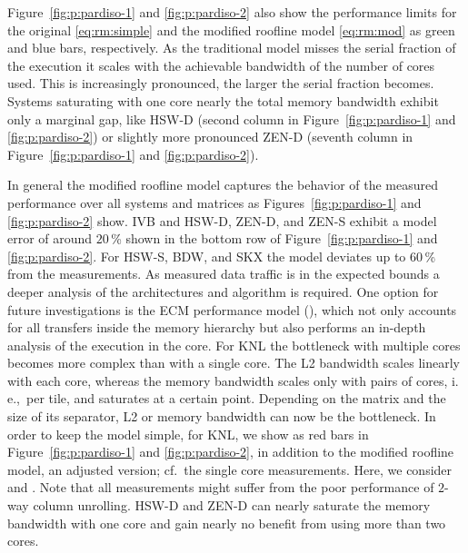 Figure~\ref{fig:p:pardiso-1} and \ref{fig:p:pardiso-2} also show the performance limits for the original
\eqref{eq:rm:simple} and the modified roofline model \eqref{eq:rm:mod}
as green and blue bars, respectively.
As the traditional model misses the serial fraction of the execution it scales
with the achievable bandwidth of the number of cores used.
This is increasingly pronounced, the larger the serial fraction becomes. 
%
Systems saturating with one core nearly the total memory bandwidth exhibit
only a marginal gap, like HSW-D (second column in Figure~\ref{fig:p:pardiso-1} and \ref{fig:p:pardiso-2}) or
slightly more pronounced ZEN-D (seventh column in Figure~\ref{fig:p:pardiso-1} and \ref{fig:p:pardiso-2}).

In general the modified roofline model captures the behavior of the measured
performance over all systems and matrices as Figures~\ref{fig:p:pardiso-1} and \ref{fig:p:pardiso-2} show.
%
%
IVB and HSW-D, ZEN-D, and ZEN-S exhibit a model error of around $20$\,\% shown
in the bottom row of Figure~\ref{fig:p:pardiso-1} and \ref{fig:p:pardiso-2}.
For HSW-S, BDW, and SKX the model deviates up to $60$\,\% from the measurements.
%
%
As measured data traffic is in the expected bounds a deeper analysis of the
architectures and algorithm is required.
One option for future investigations is the ECM performance
model (\cite{hager-2012-ecm}), which not only accounts for all transfers inside
the memory hierarchy but also performs an in-depth analysis of the execution in
the core.
%
%
For KNL the bottleneck with multiple cores becomes more complex than with a
single core.
The L2 bandwidth scales linearly with each core, whereas the memory bandwidth
scales only with pairs of cores, i.\,e.,\ per tile, and saturates at a certain
point.
Depending on the matrix and the size of its separator, L2 or memory bandwidth can
now be the bottleneck.
%
In order to keep the model simple, for KNL, we show
as red bars in Figure~\ref{fig:p:pardiso-1} and \ref{fig:p:pardiso-2},
in addition
to the modified
roofline model, 
an adjusted version; cf.\ the single core measurements.
Here, we consider  and .
Note that all measurements might suffer from the poor performance of $2$-way
column unrolling.
%
% 
HSW-D and ZEN-D can nearly saturate the memory bandwidth with one core and gain
nearly no benefit from using more than two cores.

